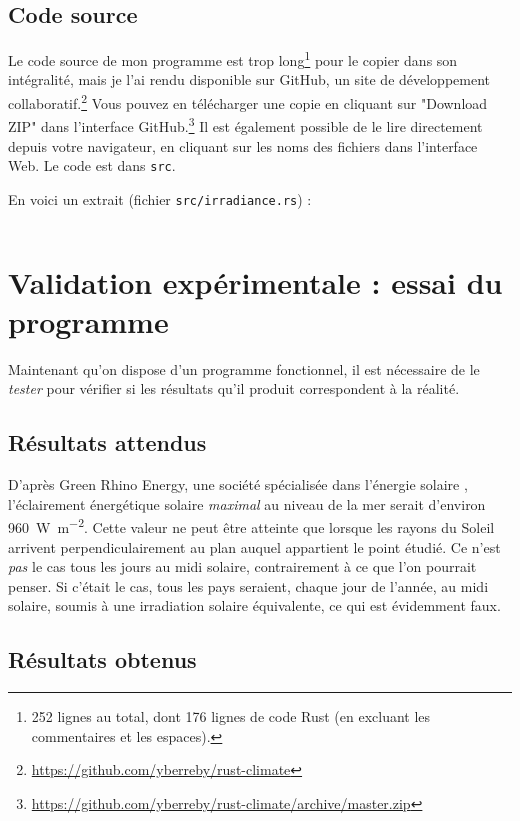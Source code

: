 \documentclass[12pt]{article}
\begin{document}
\FloatBarrier
\subsection{Code source}

Le code source de mon programme est trop long\footnote{252 lignes au total, dont 176 lignes de code Rust (en excluant les commentaires et les espaces).} pour le copier dans son intégralité, mais je l'ai rendu disponible sur GitHub, un site de développement collaboratif.\footnote{\url{https://github.com/yberreby/rust-climate}}
Vous pouvez en télécharger une copie en cliquant sur "Download ZIP" dans l'interface GitHub.\footnote{\url{https://github.com/yberreby/rust-climate/archive/master.zip}}
Il est également possible de le lire directement depuis votre navigateur, en cliquant sur les noms des fichiers dans l'interface Web.
Le code est dans \texttt{src}.

En voici un extrait (fichier \texttt{src/irradiance.rs}) :

\inputminted[linenos]{rust}{rust-climate/src/irradiance.rs}



\section{Validation expérimentale : essai du programme}

Maintenant qu'on dispose d'un programme fonctionnel, il est nécessaire de le \emph{tester} pour vérifier si les résultats qu'il produit correspondent à la réalité.

\subsection{Résultats attendus}

D'après Green Rhino Energy, une société spécialisée dans l'énergie solaire \cite{green_rhino_irradiance}, l'éclairement énergétique solaire \emph{maximal} au niveau de la mer serait d'environ \SI{960}{\watt\per\square\meter}.
Cette valeur ne peut être atteinte que lorsque les rayons du Soleil arrivent perpendiculairement au plan auquel appartient le point étudié.
Ce n'est \emph{pas} le cas tous les jours au midi solaire, contrairement à ce que l'on pourrait penser.
Si c'était le cas, tous les pays seraient, chaque jour de l'année, au midi solaire, soumis à une irradiation solaire équivalente, ce qui est évidemment faux.


\subsection{Résultats obtenus}
\end{document}
